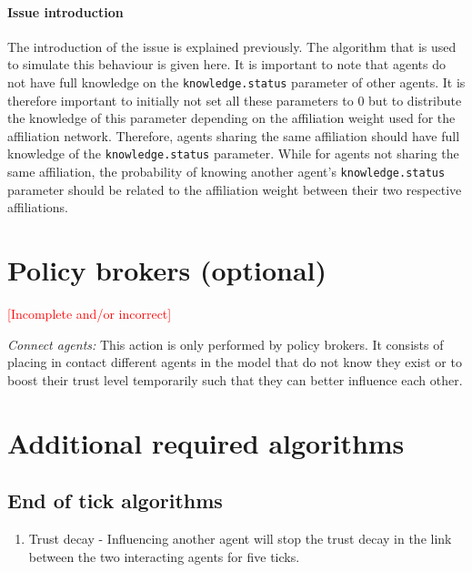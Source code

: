 \paragraph{Issue introduction}

The introduction of the issue is explained previously. The algorithm that is used to simulate this behaviour is given here. It is important to note that agents do not have full knowledge on the \texttt{knowledge.status} parameter of other agents. It is therefore important to initially not set all these parameters to 0 but to distribute the knowledge of this parameter depending on the affiliation weight used for the affiliation network. Therefore, agents sharing the same affiliation should have full knowledge of the \texttt{knowledge.status} parameter. While for agents not sharing the same affiliation, the probability of knowing another agent's \texttt{knowledge.status} parameter should be related to the affiliation weight between their two respective affiliations.



\section{Policy brokers (optional)}

\textcolor{red}{[Incomplete and/or incorrect]}

\emph{Connect agents:} This action is only performed by policy brokers. It consists of placing in contact different agents in the model that do not know they exist or to boost their trust level temporarily such that they can better influence each other.


\section{Additional required algorithms}




\subsection{End of tick algorithms}

\begin{enumerate}
\item Trust decay - Influencing another agent will stop the trust decay in the link between the two interacting agents for five ticks.
\end{enumerate}

